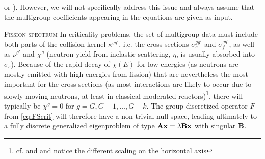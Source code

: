\cite[Chap.~5]{Cacuci1} or \cite{Cho1}). However, we will not specifically address this issue and always assume that 
the multigroup coefficients appearing in the equations are given as input.
\begin{remark}{\textsc{Fission spectrum}}
In criticality problems, the set of multigroup data must include both parts of the collision kernel
$\kappa^{gg'}$, i.e. the cross-sections $\sigma_s^{gg'}$ and $\sigma_f^{gg'}$, as well as $\nu^{g'}$ and
$\chi^g$ (neutron yield from inelastic scattering, $\eta$, is usually absorbed into $\sigma_s$). Because of the rapid
decay of $\chi(E)$ for low energies (as neutrons are mostly emitted with high energies from fission) that are
nevertheless the most important for the cross-sections (as most interactions are likely to occur due to slowly moving
neutrons, at least in classical moderated reactors)\footnote{cf.  and  and notice the
different scaling on the horizontal axis}, there will typically be $\chi^g = 0$ for $g = G,G-1,\ldots,G-k$. The
group-discretized operator $F$ from \eqref{eq:FScrit} will therefore have a non-trivial null-space, leading ultimately
to a fully discrete generalized eigenproblem of type $\mathbf{A}\mathbf{x} = \lambda\mathbf{B}\mathbf{x}$ with singular $\mathbf{B}$.
\end{remark}


